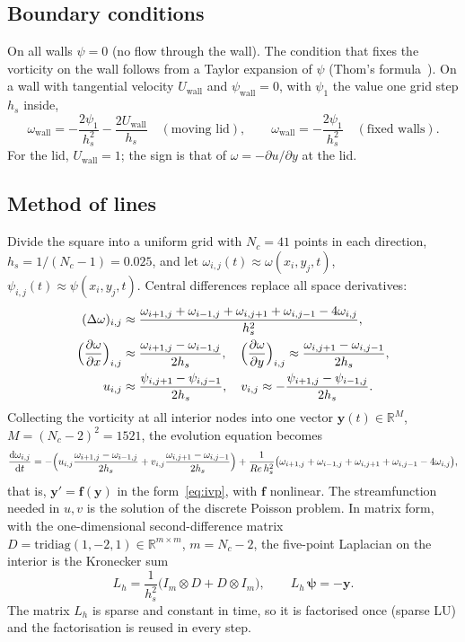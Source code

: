 \documentclass[11pt,a4paper]{article}
\newcommand{\dd}{\mathrm{d}}
\newcommand{\R}{\mathbb{R}}
\newcommand{\bfy}{\mathbf{y}}
\newcommand{\bff}{\mathbf{f}}
\begin{document}
\subsection{Boundary conditions}

On all walls $\psi=0$ (no flow through the wall). The condition that fixes the vorticity on the wall
follows from a Taylor expansion of $\psi$ (Thom's formula~\cite{thom1933}). On a wall with tangential velocity
$U_{\mathrm{wall}}$ and $\psi_{\mathrm{wall}}=0$, with $\psi_1$ the value one grid step $h_s$ inside,
\begin{equation}
\omega_{\mathrm{wall}}=-\frac{2\psi_1}{h_s^2}-\frac{2U_{\mathrm{wall}}}{h_s}\quad(\text{moving lid}),\qquad
\omega_{\mathrm{wall}}=-\frac{2\psi_1}{h_s^2}\quad(\text{fixed walls}).
\end{equation}
For the lid, $U_{\mathrm{wall}}=1$; the sign is that of $\omega=-\partial u/\partial y$ at the lid.

\subsection{Method of lines}

Divide the square into a uniform grid with $N_c=41$ points in each direction, $h_s=1/(N_c-1)=0.025$,
and let $\omega_{i,j}(t)\approx\omega(x_i,y_j,t)$, $\psi_{i,j}(t)\approx\psi(x_i,y_j,t)$. Central
differences replace all space derivatives:
\begin{align}
(\Delta\omega)_{i,j}&\approx\frac{\omega_{i+1,j}+\omega_{i-1,j}+\omega_{i,j+1}+\omega_{i,j-1}-4\omega_{i,j}}{h_s^2},\\
\Bigl(\frac{\partial\omega}{\partial x}\Bigr)_{i,j}&\approx\frac{\omega_{i+1,j}-\omega_{i-1,j}}{2h_s},\quad
\Bigl(\frac{\partial\omega}{\partial y}\Bigr)_{i,j}\approx\frac{\omega_{i,j+1}-\omega_{i,j-1}}{2h_s},\\
u_{i,j}&\approx\frac{\psi_{i,j+1}-\psi_{i,j-1}}{2h_s},\quad
v_{i,j}\approx-\frac{\psi_{i+1,j}-\psi_{i-1,j}}{2h_s}.
\end{align}
Collecting the vorticity at all interior nodes into one vector $\bfy(t)\in\R^{M}$, $M=(N_c-2)^2=1521$,
the evolution equation becomes
\begin{equation}
\frac{\dd\omega_{i,j}}{\dd t}=-\Bigl(u_{i,j}\frac{\omega_{i+1,j}-\omega_{i-1,j}}{2h_s}
+v_{i,j}\frac{\omega_{i,j+1}-\omega_{i,j-1}}{2h_s}\Bigr)
+\frac{1}{Re\,h_s^2}\bigl(\omega_{i+1,j}+\omega_{i-1,j}+\omega_{i,j+1}+\omega_{i,j-1}-4\omega_{i,j}\bigr),
\end{equation}
that is, $\bfy'=\bff(\bfy)$ in the form~\eqref{eq:ivp}, with $\bff$ nonlinear. The streamfunction
needed in $u,v$ is the solution of the discrete Poisson problem. In matrix form, with the
one-dimensional second-difference matrix $D=\mathrm{tridiag}(1,-2,1)\in\R^{m\times m}$, $m=N_c-2$, the
five-point Laplacian on the interior is the Kronecker sum
\begin{equation}
L_h=\frac1{h_s^2}\bigl(I_m\otimes D+D\otimes I_m\bigr),\qquad L_h\,\boldsymbol\psi=-\mathbf y .
\end{equation}
The matrix $L_h$ is sparse and constant in time, so it is factorised once (sparse LU) and the
factorisation is reused in every step.
\end{document}
